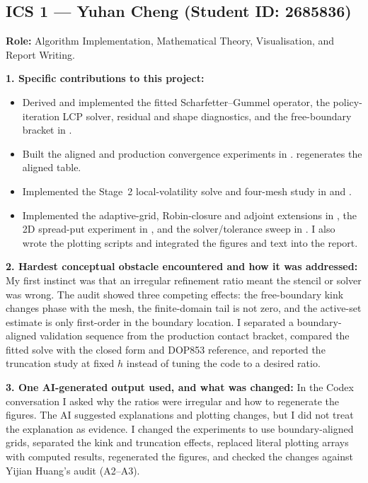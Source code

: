 \documentclass[11pt,a4paper]{article}
\theoremstyle{definition}
\theoremstyle{remark}
\begin{document}
\subsection*{ICS 1 --- Yuhan Cheng (Student ID: 2685836)}
\begin{formbox}
\small
\textbf{Role:} Algorithm Implementation, Mathematical Theory, Visualisation,
and Report Writing.

\textbf{1. Specific contributions to this project:}
\begin{itemize}[leftmargin=1.4em, itemsep=1pt]
\item Derived and implemented the fitted Scharfetter--Gummel operator, the
policy-iteration LCP solver, residual and shape diagnostics, and the
free-boundary bracket in .
\item Built the aligned and production convergence experiments in
.\newline
{} regenerates the aligned table.
\item Implemented the Stage~2 local-volatility solve and four-mesh study in
\newline{} and
.
\item Implemented the adaptive-grid, Robin-closure and adjoint extensions in
, the 2D spread-put experiment in
, and the solver/tolerance sweep in
. I also wrote the plotting scripts and
integrated the figures and text into the report.
\end{itemize}

\textbf{2. Hardest conceptual obstacle encountered and how it was addressed:}
My first instinct was that an irregular refinement ratio meant the stencil or
solver was wrong. The audit showed three competing effects: the free-boundary
kink changes phase with the mesh, the finite-domain tail is not zero, and the
active-set estimate is only first-order in the boundary location. I separated
a boundary-aligned validation sequence from the production contact bracket,
compared the fitted solve with the closed form and DOP853 reference, and
reported the truncation study at fixed $h$ instead of tuning the code to a
desired ratio.

\textbf{3. One AI-generated output used, and what was changed:}
In the Codex conversation I asked why the ratios were irregular and how to
regenerate the figures. The AI suggested explanations and plotting changes,
but I did not treat the explanation as evidence. I changed the experiments to
use boundary-aligned grids, separated the kink and truncation effects,
replaced literal plotting arrays with computed results, regenerated the
figures, and checked the changes against Yijian Huang's audit (A2--A3).


\end{formbox}
\end{document}
